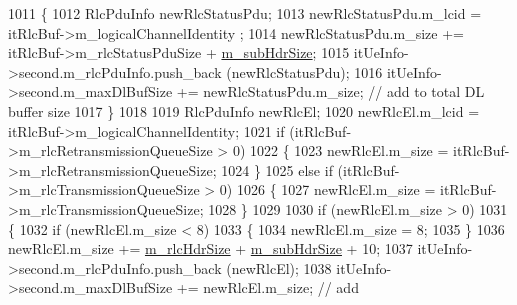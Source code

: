 \begin{DoxyCode}
1011                                         \{
1012                                                 RlcPduInfo newRlcStatusPdu;
1013                                                 newRlcStatusPdu.m\_lcid = itRlcBuf->m\_logicalChannelIdentity
      ;
1014                                                 newRlcStatusPdu.m\_size += itRlcBuf->m\_rlcStatusPduSize + 
      \hyperlink{classns3_1_1MmWaveFlexTtiMacScheduler_ac2c5c229b7350214b5ff56c2a9167020}{m\_subHdrSize};
1015                                                 itUeInfo->second.m\_rlcPduInfo.push\_back (newRlcStatusPdu);
1016                                                 itUeInfo->second.m\_maxDlBufSize += newRlcStatusPdu.m\_size; 
       \textcolor{comment}{// add to total DL buffer size}
1017                                         \}
1018 
1019                                         RlcPduInfo newRlcEl;
1020                                         newRlcEl.m\_lcid = itRlcBuf->m\_logicalChannelIdentity;
1021                                         \textcolor{keywordflow}{if} (itRlcBuf->m\_rlcRetransmissionQueueSize > 0)
1022                                         \{
1023                                                 newRlcEl.m\_size = itRlcBuf->m\_rlcRetransmissionQueueSize;
1024                                         \}
1025                                         \textcolor{keywordflow}{else} \textcolor{keywordflow}{if} (itRlcBuf->m\_rlcTransmissionQueueSize > 0)
1026                                         \{
1027                                                 newRlcEl.m\_size = itRlcBuf->m\_rlcTransmissionQueueSize;
1028                                         \}
1029 
1030                                         \textcolor{keywordflow}{if} (newRlcEl.m\_size > 0)
1031                                         \{
1032                                                 \textcolor{keywordflow}{if} (newRlcEl.m\_size < 8)
1033                                                 \{
1034                                                         newRlcEl.m\_size = 8;
1035                                                 \}
1036                                                 newRlcEl.m\_size += \hyperlink{classns3_1_1MmWaveFlexTtiMacScheduler_a2c5b4f384597954f87952522bd1fa94f}{m\_rlcHdrSize} + 
      \hyperlink{classns3_1_1MmWaveFlexTtiMacScheduler_ac2c5c229b7350214b5ff56c2a9167020}{m\_subHdrSize} + 10;
1037                                                 itUeInfo->second.m\_rlcPduInfo.push\_back (newRlcEl);
1038                                                 itUeInfo->second.m\_maxDlBufSize += newRlcEl.m\_size;  \textcolor{comment}{// add
}
\end{DoxyCode}
